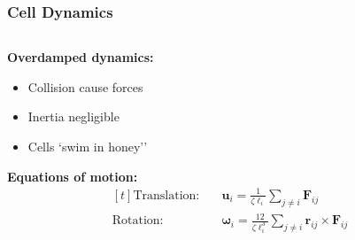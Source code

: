 \documentclass[10pt,t]{beamer}
\begin{document}
\begin{frame}
    \frametitle{Cell Dynamics}

    \begin{columns}[c]
        \begin{column}{0.5\textwidth}

            \textbf{Overdamped dynamics:}
            \begin{itemize}
                \item Collision cause forces
                \item Inertia negligible
                \item Cells `swim in honey''
            \end{itemize}

            \vspace{0.5cm}

            \textbf{Equations of motion:}
            \begin{equation*}
                \begin{aligned}[t]
                    \text{Translation:} \quad & \mathbf{u}_i = \frac{1}{\zeta \ell_i} \sum_{j \neq i} \mathbf{F}_{ij}                                    \\
                    \text{Rotation:} \qquad   & \boldsymbol{\omega}_i = \frac{12}{\zeta \ell_i^3} \sum_{j \neq i} \mathbf{r}_{ij} \times \mathbf{F}_{ij}
                \end{aligned}
            \end{equation*}
        \end{column}


\end{columns}
\end{frame}
\end{document}
